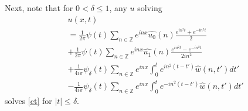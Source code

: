 \documentclass[12pt,reqno]{amsart}
\numberwithin{equation}{section}  %
\newcommand{\zz}{\mathbb{Z}}
\newcommand{\wh}{\widehat}
\begin{document}
Next, note that for $0 < \delta \le 1$, any $u$
solving
\begin{align}
  & u(x,t) 
    \\
    & = \frac{1}{2 \pi}\psi(t)
    \sum_{n \in \zz} e^{inx} \wh{u_{0}}(n) \frac{e^{in^{2}t} + e^{-in^{2}t}}{2} 
    \\
    & + \frac{1}{2 \pi}\psi(t) \sum_{n \in \zz} e^{inx}
    \wh{u_{1}}(n)\frac{e^{in^{2}t} - e^{-in^{2}t}}{2 i n^{2}} 
    \\
    \label{term-3}
    & + \frac{1}{4 i \pi} \psi_{\delta}(t) \sum_{n \in \zz} e^{inx}
    \int_{0}^{t}e^{in^{2}(t-t')}
    \wh{w}(n, t') dt'
    \\
    \label{term-4}
    & - \frac{1}{4 i \pi} \psi_{\delta} (t) \sum_{n \in \zz} e^{inx}
    \int_{0}^{t}e^{-in^{2}(t-t')}
    \wh{w}(n, t') dt'
  \end{align}
  solves \eqref{ct} for $| t | \le \delta$. 
\end{document}
